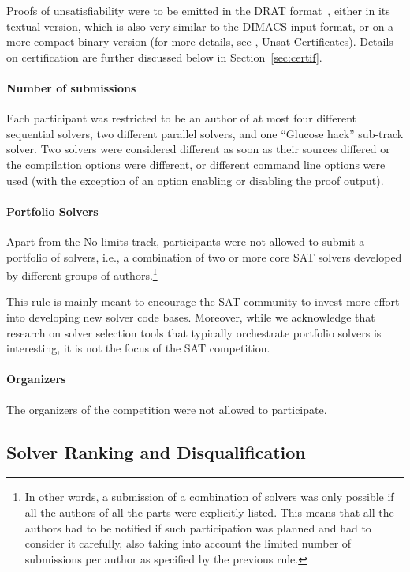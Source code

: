 \documentclass{elsarticle}
\begin{document}
Proofs of unsatisfiability were to be emitted in the DRAT format~\cite{DRATtrim},
either in its textual version, which is also very similar to the DIMACS input format,
or on a more compact binary version (for more details, see \cite{satComp2020www}, Unsat Certificates).
%
Details on certification are further discussed below in Section~\ref{sec:certif}.

\paragraph{Number of submissions}

Each participant was restricted to be an author of at most four different sequential solvers,
two different parallel solvers, and one ``Glucose hack'' sub-track solver.
Two solvers were considered different as soon as their sources differed
or the compilation options were different, or different command line options were used
(with the exception of an option enabling or disabling the proof output).

\paragraph{Portfolio Solvers}

Apart from the No-limits track, participants were not allowed to submit a portfolio of solvers,
i.e., a combination of two or more core SAT solvers developed by different groups of authors.\footnote{
In other words, a submission of a combination of solvers was only possible if all the authors of all the parts
were explicitly listed. This means that all the authors had to be notified if such participation
was planned and had to consider it carefully, also taking into account the limited number of submissions per author
as specified by the previous rule.}

This rule is mainly meant to encourage the SAT community to invest more effort into developing new solver code bases.
Moreover, while we acknowledge that research on solver selection tools that typically orchestrate portfolio solvers 
is interesting, it is not the focus of the SAT competition.


\paragraph{Organizers}
The organizers of the competition were not allowed to participate.

\subsection{Solver Ranking and Disqualification}
\end{document}

